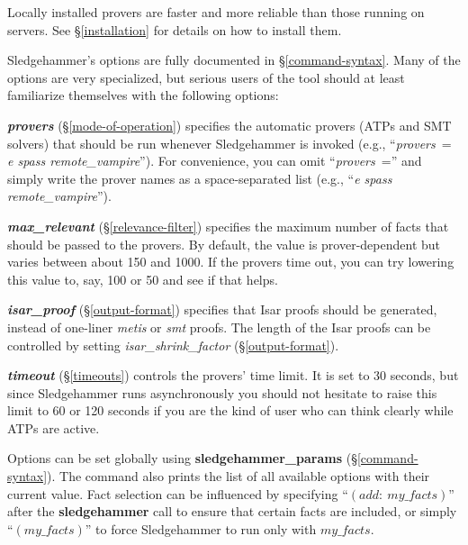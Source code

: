 \documentclass[a4paper,12pt]{article}
\begin{document}

Locally installed provers are faster and more reliable than those running on
servers. See \S\ref{installation} for details on how to install them.


Sledgehammer's options are fully documented in \S\ref{command-syntax}. Many of
the options are very specialized, but serious users of the tool should at least
familiarize themselves with the following options:

\begin{enum}
\item[\labelitemi] \textbf{\textit{provers}} (\S\ref{mode-of-operation}) specifies
the automatic provers (ATPs and SMT solvers) that should be run whenever
Sledgehammer is invoked (e.g., ``\textit{provers}~= \textit{e spass
remote\_vampire\/}''). For convenience, you can omit ``\textit{provers}~=''
and simply write the prover names as a space-separated list (e.g., ``\textit{e
spass remote\_vampire\/}'').

\item[\labelitemi] \textbf{\textit{max\_relevant}} (\S\ref{relevance-filter})
specifies the maximum number of facts that should be passed to the provers. By
default, the value is prover-dependent but varies between about 150 and 1000. If
the provers time out, you can try lowering this value to, say, 100 or 50 and see
if that helps.

\item[\labelitemi] \textbf{\textit{isar\_proof}} (\S\ref{output-format}) specifies
that Isar proofs should be generated, instead of one-liner \textit{metis} or
\textit{smt} proofs. The length of the Isar proofs can be controlled by setting
\textit{isar\_shrink\_factor} (\S\ref{output-format}).

\item[\labelitemi] \textbf{\textit{timeout}} (\S\ref{timeouts}) controls the
provers' time limit. It is set to 30 seconds, but since Sledgehammer runs
asynchronously you should not hesitate to raise this limit to 60 or 120 seconds
if you are the kind of user who can think clearly while ATPs are active.
\end{enum}

Options can be set globally using \textbf{sledgehammer\_params}
(\S\ref{command-syntax}). The command also prints the list of all available
options with their current value. Fact selection can be influenced by specifying
``$(\textit{add}{:}~\textit{my\_facts})$'' after the \textbf{sledgehammer} call
to ensure that certain facts are included, or simply ``$(\textit{my\_facts})$''
to force Sledgehammer to run only with $\textit{my\_facts}$.
\end{document}
